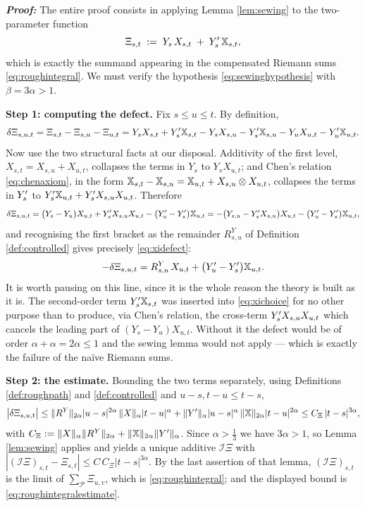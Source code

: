 \textbf{\textit{Proof:}} The entire proof consists in applying Lemma \ref{lem:sewing} to the
two-parameter function
\begin{equation}\label{eq:xichoice}
\Xi_{s,t} \;:=\; Y_s\,X_{s,t} \;+\; Y'_s\,\mathbb{X}_{s,t},
\end{equation}
which is exactly the summand appearing in the compensated Riemann sums \eqref{eq:roughintegral}. We
must verify the hypothesis \eqref{eq:sewinghypothesis} with $\beta = 3\alpha > 1$.

\medskip
\noindent\textbf{Step 1: computing the defect.} Fix $s\leq u\leq t$. By definition,
\[
\delta \Xi_{s,u,t} = \Xi_{s,t}-\Xi_{s,u}-\Xi_{u,t}
= Y_s X_{s,t} + Y'_s\mathbb{X}_{s,t} - Y_sX_{s,u} - Y'_s\mathbb{X}_{s,u} - Y_uX_{u,t} - Y'_u\mathbb{X}_{u,t}.
\]
Now use the two structural facts at our disposal. Additivity of the first level,
$X_{s,t} = X_{s,u}+X_{u,t}$, collapses the terms in $Y_s$ to $Y_sX_{u,t}$; and Chen's relation
\eqref{eq:chenaxiom}, in the form $\mathbb{X}_{s,t}-\mathbb{X}_{s,u} = \mathbb{X}_{u,t} + X_{s,u}\otimes X_{u,t}$,
collapses the terms in $Y'_s$ to $Y'_s\mathbb{X}_{u,t} + Y'_s X_{s,u}X_{u,t}$. Therefore
\[
\delta \Xi_{s,u,t} = \bigl(Y_s - Y_u\bigr)X_{u,t} + Y'_sX_{s,u}X_{u,t} - \bigl(Y'_u - Y'_s\bigr)\mathbb{X}_{u,t}
= -\bigl(Y_{s,u} - Y'_sX_{s,u}\bigr)X_{u,t} - \bigl(Y'_u-Y'_s\bigr)\mathbb{X}_{u,t},
\]
and recognising the first bracket as the remainder $R^Y_{s,u}$ of Definition \ref{def:controlled}
gives precisely \eqref{eq:xidefect}:
\[
-\delta \Xi_{s,u,t} = R^{Y}_{s,u}\,X_{u,t} + \bigl(Y'_u - Y'_s\bigr)\mathbb{X}_{u,t}.
\]
It is worth pausing on this line, since it is the whole reason the theory is built as it is. The
second-order term $Y'_s\mathbb{X}_{s,t}$ was inserted into \eqref{eq:xichoice} for no other purpose than
to produce, via Chen's relation, the cross-term $Y'_sX_{s,u}X_{u,t}$ which cancels the leading
part of $(Y_s-Y_u)X_{u,t}$. Without it the defect would be of order $\alpha+\alpha = 2\alpha \leq 1$
and the sewing lemma would not apply --- which is exactly the failure of the naïve Riemann sums.

\medskip
\noindent\textbf{Step 2: the estimate.} Bounding the two terms separately, using Definitions
\ref{def:roughpath} and \ref{def:controlled} and $u-s, t-u \leq t-s$,
\[
\bigl|\delta \Xi_{s,u,t}\bigr|
\leq \lVert R^Y\rVert_{2\alpha}|u-s|^{2\alpha}\,\lVert X\rVert_{\alpha}|t-u|^{\alpha}
+ \lVert Y'\rVert_{\alpha}|u-s|^{\alpha}\,\lVert\mathbb{X}\rVert_{2\alpha}|t-u|^{2\alpha}
\leq C_\Xi\,|t-s|^{3\alpha},
\]
with $C_\Xi := \lVert X\rVert_\alpha\lVert R^Y\rVert_{2\alpha} + \lVert\mathbb{X}\rVert_{2\alpha}\lVert Y'\rVert_\alpha$.
Since $\alpha>\tfrac13$ we have $3\alpha>1$, so Lemma \ref{lem:sewing} applies and yields a unique
additive $\mathcal{I}\Xi$ with
$|(\mathcal{I}\Xi)_{s,t}-\Xi_{s,t}| \leq C\,C_\Xi|t-s|^{3\alpha}$. By the last assertion of that
lemma, $(\mathcal{I}\Xi)_{s,t}$ is the limit of $\sum_{\mathcal{P}}\Xi_{u,v}$, which is
\eqref{eq:roughintegral}; and the displayed bound is \eqref{eq:roughintegralestimate}.

